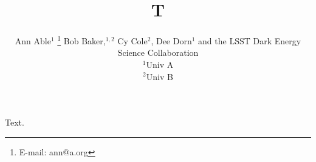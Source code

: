 \documentclass{mnras}
\title{T}
\author[A. Able et al.]{Ann Able$^{1}$
\thanks{E-mail: ann@a.org}
Bob Baker,$^{1,2}$
Cy Cole$^{2}$,
\newauthor
Dee Dorn$^{1}$\newauthor
and the LSST Dark Energy Science Collaboration
\\
$^{1}$Univ A\\
$^{2}$Univ B}
\begin{document}
\maketitle
Text.
\end{document}
